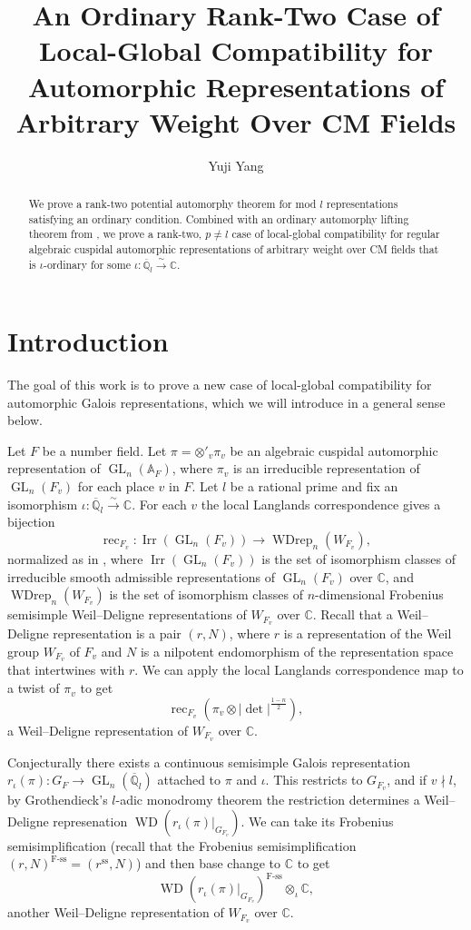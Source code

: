 \documentclass[10pt]{article}
\title{An Ordinary Rank-Two Case of Local-Global Compatibility for Automorphic Representations of Arbitrary Weight Over CM Fields}
\author{Yuji Yang}
\date{}
\theoremstyle{definition}
\numberwithin{equation}{theorem}
\newcommand{\AAA}{\mathbb{A}}
\newcommand{\CC}{\mathbb{C}}
\newcommand{\QQ}{\mathbb{Q}}
\DeclareMathOperator{\Fss}{F-ss}
\DeclareMathOperator{\GL}{GL}
\DeclareMathOperator{\Irr}{Irr}
\DeclareMathOperator{\rec}{rec}
\DeclareMathOperator{\Ss}{ss}
\DeclareMathOperator{\WD}{WD}
\DeclareMathOperator{\WDrep}{WDrep}
\begin{document}
\maketitle
\begin{abstract}
We prove a rank-two potential automorphy theorem for mod $l$ representations satisfying an ordinary condition. Combined with an ordinary automorphy lifting theorem from \cite{ACC+18}, we prove a rank-two, $p\ne l$ case of local-global compatibility for regular algebraic cuspidal automorphic representations of arbitrary weight over CM fields that is $\iota$-ordinary for some $\iota:\overline{\QQ}_l\xrightarrow{\sim}\CC$.
\end{abstract}
\section{Introduction}

The goal of this work is to prove a new case of local-global compatibility for automorphic Galois representations, which we will introduce in a general sense below.

Let $F$ be a number field. Let $\pi=\otimes'_v\pi_v$ be an algebraic cuspidal automorphic representation of $\GL_n(\AAA_F)$, where $\pi_v$ is an irreducible representation of $\GL_n(F_v)$ for each place $v$ in $F$. Let $l$ be a rational prime and fix an isomorphism $\iota:\overline{\QQ}_l\xrightarrow{\sim}\CC$. For each $v$ the local Langlands correspondence gives a bijection
$$\rec_{F_v}:\Irr(\GL_n(F_v))\to\WDrep_n(W_{F_v}),$$
normalized as in \cite{HT01}, where $\Irr(\GL_n(F_v))$ is the set of isomorphism classes of irreducible smooth admissible representations of $\GL_n(F_v)$ over $\CC$, and $\WDrep_n(W_{F_v})$ is the set of isomorphism classes of $n$-dimensional Frobenius semisimple Weil--Deligne representations of $W_{F_v}$ over $\CC$. Recall that a Weil--Deligne representation is a pair $(r,N)$, where $r$ is a representation of the Weil group $W_{F_v}$ of $F_v$ and $N$ is a nilpotent endomorphism of the representation space that intertwines with $r$. We can apply the local Langlands correspondence map to a twist of $\pi_v$ to get $$\rec_{F_v}(\pi_v\otimes|\det|^{\frac{1-n}{2}}),$$ 
a Weil--Deligne representation of $W_{F_v}$ over $\CC$.

Conjecturally there exists a continuous semisimple Galois representation $r_\iota(\pi):G_F\to \GL_n(\overline{\QQ}_l)$ attached to $\pi$ and $\iota$. This restricts to $G_{F_v}$, and if $v\nmid l$, by Grothendieck's $l$-adic monodromy theorem the restriction determines a Weil--Deligne represenation $\WD(r_\iota(\pi)|_{G_{F_v}})$. We can take its Frobenius semisimplification (recall that the Frobenius semisimplification $(r,N)^{\Fss}=(r^{\Ss},N)$) and then base change to $\CC$ to get $$\WD(r_\iota(\pi)|_{G_{F_v}})^{\Fss}\otimes_\iota\CC,$$
another Weil--Deligne representation of $W_{F_v}$ over $\CC$.
\end{document}
